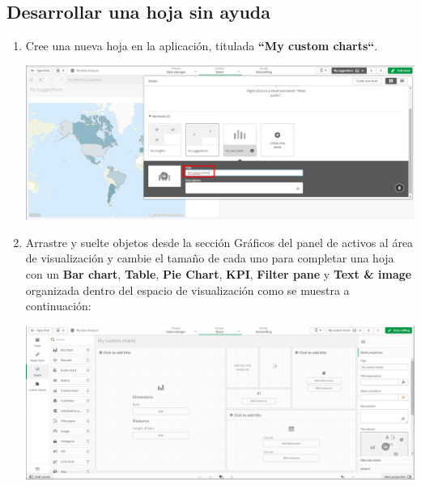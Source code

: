 \documentclass[12pt,letterpaper]{article}
\newcommand\tab[1][1cm]{\hspace*{#1}}
\begin{document}
    \subsection{Desarrollar una hoja sin ayuda}
    \begin{enumerate}[\tab 1.]
        \item Cree una nueva hoja en la aplicación, titulada \textbf{“My custom charts“}.
        \begin{center}
            \includegraphics[width=13cm]{./img/img28.png}
        \end{center}
        \item Arrastre y suelte objetos desde la sección Gráficos del panel de activos al área de visualización y cambie el tamaño de cada uno para completar una hoja con un \textbf{Bar chart}, \textbf{Table}, \textbf{Pie Chart}, \textbf{KPI}, \textbf{Filter pane} y \textbf{Text \& image} organizada dentro del espacio de visualización como se muestra a continuación:
        \begin{center}
            \includegraphics[width=13cm]{./img/img29.png}
        \end{center}
    \end{enumerate}
\end{document}
